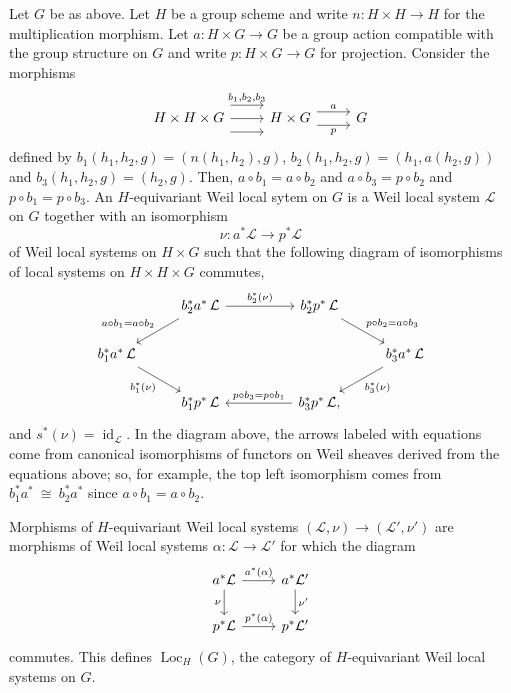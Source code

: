 \documentclass[10pt]{amsart}
\theoremstyle{plain}
\theoremstyle{definition}
\DeclareMathOperator{\id}{id}
\DeclareMathOperator{\Loc}{Loc}
\newcommand{\iso}{{\ \cong\ }}
\newcommand{\cs}[1]{{\mathcal{#1}}}
\begin{document}
Let $G$ be as above.
Let $H$ be a group scheme and write $n : H \times H \to H$ for the multiplication morphism.
Let $a : H \times G\to G$ be a group action compatible with the group structure on $G$ and write $p : H\times G \to G$ for projection. 
Consider the morphisms
\[
\begin{tikzcd}
H \times H \times G 
\arrow[shift left=4]{r}{b_1, b_2, b_3} 
\arrow{r}{}
\arrow[shift right=4]{r}{} 
& H \times G 
\arrow[shift left=2]{r}{a}
\arrow[shift right=2]{r}[swap]{p}
 & G 
\end{tikzcd}
\]
defined by $b_1(h_1,h_2,g) = (n(h_1,h_2),g)$,  $b_2(h_1,h_2,g) = (h_1,a(h_2,g))$ and $b_3(h_1,h_2,g) = (h_2,g)$.
Then, $a\circ b_1 = a\circ b_2$ and $a\circ b_3 = p\circ b_2$ and $p\circ b_1 = p\circ b_3$.
An $H$-equivariant Weil local sytem on $G$ is a Weil local system $\cs{L}$ on $G$ together with an isomorphism  
\[
\nu : a^*\cs{L} \to p^*\cs{L}
\] 
of Weil local systems on $H\times G$ such that the following diagram of isomorphisms of local systems on $H\times H\times G$ commutes,
\[
\begin{tikzcd}
\ &  \arrow{dl}[swap]{a\circ b_1 = a\circ b_2}  b_2^*  a^*\, \mathcal{L} \arrow{rr}{b_2^*(\nu)} && b_2^* p^*\, \mathcal{L} \arrow{dr}{p\circ b_2 = a\circ b_3} & \\
b_1^* a^*\, \mathcal{L} \arrow{dr}[swap]{b_1^*(\nu)} &&&&   \arrow{dl}{b_3^*(\nu)} b_3^* a^*\, \mathcal{L} \\
& b_1^* p^*\, \mathcal{L}  && \arrow{ll}[swap]{p\circ b_3 = p\circ b_1} b_3^* p^*\, \mathcal{L}, & 
\end{tikzcd}
\]
and $s^*(\nu) = \id_{\cs{L}}$.
In the diagram above, the arrows labeled with equations come from canonical isomorphisms of functors on Weil sheaves derived from the equations above; so, for example, the top left isomorphism comes from $b_1^* a^* \iso b_2^* a^*$ since $a\circ b_1 = a\circ b_2$.
\iffalse
We remark that, on stalks, this condition is ...
\[
\begin{tikzcd}
\ &  \cs{L}_{x\cdot(y\cdot z)} \arrow{r}{\nu_{x,y\cdot z}} & \cs{L}_{y\cdot z} & \\
\cs{L}_{(x\cdot y)\cdot z} \arrow{dr}[swap]{\nu_{x\cdot y,z}} \arrow[equal]{ur} &&& \arrow[equal]{ul}  \arrow{dl}{\nu_{y,z}} \cs{L}_{y\cdot z} \\
& \cs{L}_z \arrow[equal]{r} & \cs{L}_z & 
\end{tikzcd}
\]
\fi
%
Morphisms of $H$-equivariant Weil local systems $(\cs{L},\nu)\to (\cs{L}',\nu')$ are morphisms of Weil local systems $\alpha: \cs{L}\to \cs{L}'$ for which the diagram
\[
\begin{tikzcd}
\arrow{d}[swap]{\nu} a^*\cs{L} \arrow{r}{a^*(\alpha)} & a^*\cs{L}' \arrow{d}{\nu'} \\
p^*\cs{L} \arrow{r}{p^*(\alpha)} & p^*\cs{L}'
\end{tikzcd}
\]
commutes.
This defines $\Loc_H(G)$, the category of $H$-equivariant Weil local systems on $G$.
\end{document}
